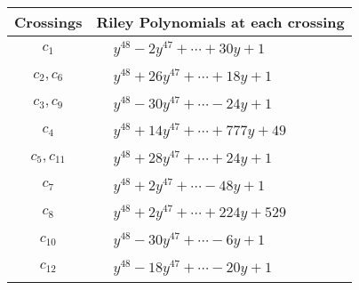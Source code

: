 \documentclass[1p]{elsarticle_modified}
\theoremstyle{definition}
\begin{document}
\begin{tabular}{m{50pt}|m{274pt}}
Crossings & \hspace{64pt}Riley Polynomials at each crossing \\
\hline $$\begin{aligned}c_{1}\end{aligned}$$&$\begin{aligned}
&y^{48}-2 y^{47}+\cdots+30 y+1
\end{aligned}$\\
\hline $$\begin{aligned}c_{2},c_{6}\end{aligned}$$&$\begin{aligned}
&y^{48}+26 y^{47}+\cdots+18 y+1
\end{aligned}$\\
\hline $$\begin{aligned}c_{3},c_{9}\end{aligned}$$&$\begin{aligned}
&y^{48}-30 y^{47}+\cdots-24 y+1
\end{aligned}$\\
\hline $$\begin{aligned}c_{4}\end{aligned}$$&$\begin{aligned}
&y^{48}+14 y^{47}+\cdots+777 y+49
\end{aligned}$\\
\hline $$\begin{aligned}c_{5},c_{11}\end{aligned}$$&$\begin{aligned}
&y^{48}+28 y^{47}+\cdots+24 y+1
\end{aligned}$\\
\hline $$\begin{aligned}c_{7}\end{aligned}$$&$\begin{aligned}
&y^{48}+2 y^{47}+\cdots-48 y+1
\end{aligned}$\\
\hline $$\begin{aligned}c_{8}\end{aligned}$$&$\begin{aligned}
&y^{48}+2 y^{47}+\cdots+224 y+529
\end{aligned}$\\
\hline $$\begin{aligned}c_{10}\end{aligned}$$&$\begin{aligned}
&y^{48}-30 y^{47}+\cdots-6 y+1
\end{aligned}$\\
\hline $$\begin{aligned}c_{12}\end{aligned}$$&$\begin{aligned}
&y^{48}-18 y^{47}+\cdots-20 y+1
\end{aligned}$\\
\hline
\end{tabular}\\~\\
\end{document}
